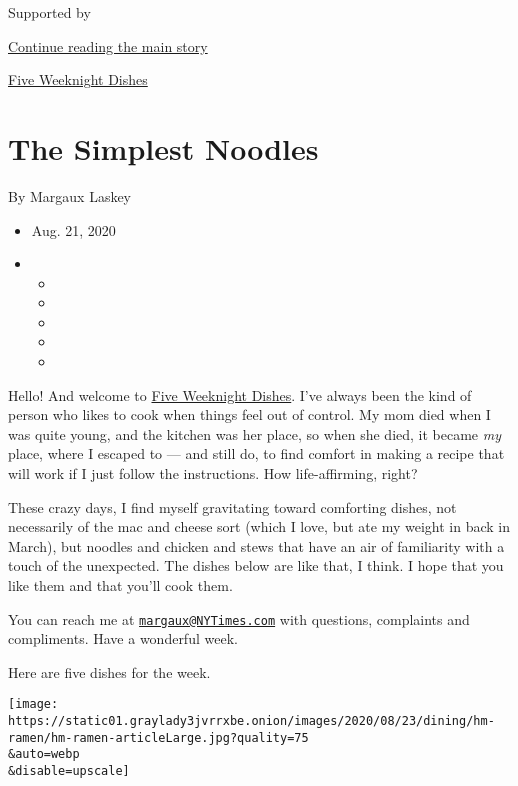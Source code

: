 Supported by

\protect\hyperlink{after-sponsor}{Continue reading the main story}

\href{/column/five-weeknight-dishes}{Five Weeknight Dishes}

\hypertarget{the-simplest-noodles}{%
\section{The Simplest Noodles}\label{the-simplest-noodles}}

By Margaux Laskey

\begin{itemize}
\item
  Aug. 21, 2020
\item
  \begin{itemize}
  \item
  \item
  \item
  \item
  \item
  \end{itemize}
\end{itemize}

Hello! And welcome to
\href{https://www.nytimes3xbfgragh.onion/column/five-weeknight-dishes}{Five
Weeknight Dishes}. I've always been the kind of person who likes to cook
when things feel out of control. My mom died when I was quite young, and
the kitchen was her place, so when she died, it became \emph{my} place,
where I escaped to --- and still do, to find comfort in making a recipe
that will work if I just follow the instructions. How life-affirming,
right?

These crazy days, I find myself gravitating toward comforting dishes,
not necessarily of the mac and cheese sort (which I love, but ate my
weight in back in March), but noodles and chicken and stews that have an
air of familiarity with a touch of the unexpected. The dishes below are
like that, I think. I hope that you like them and that you'll cook them.

You can reach me at
\href{mailto:margaux@NYTimes.com}{\nolinkurl{margaux@NYTimes.com}} with
questions, complaints and compliments. Have a wonderful week.

Here are five dishes for the week.

\texttt{[image: https://static01.graylady3jvrrxbe.onion/images/2020/08/23/dining/hm-ramen/hm-ramen-articleLarge.jpg?quality=75\\\&auto=webp\\\&disable=upscale]}

